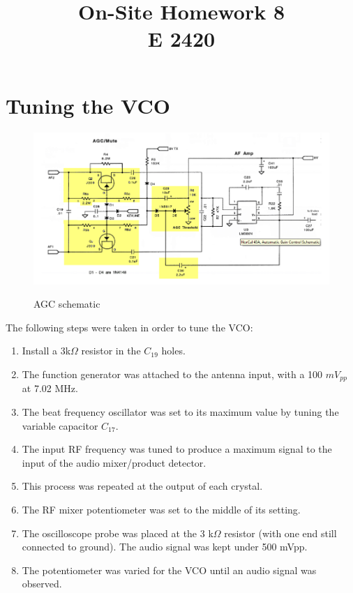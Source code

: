 \documentclass{article}
\title{On-Site Homework 8\\
  E 2420}
\author{\boxed{\text{Patrick Harrington}}}
\begin{document}
  \maketitle

  \section{Tuning the VCO}

  \begin{figure}[h!]
    \centering
    \includegraphics[scale=0.6]{AGC.png}
    \label{AGC}
    \caption{AGC schematic}
  \end{figure}
  The following steps were taken in order to tune the
  VCO:

  \begin{enumerate}
    \item   Install a 3k$\Omega$ resistor in the
      $C_{19}$ holes.
    \item   The function generator was
      attached to the antenna input, with a
      100 $mV_{pp}$ at 7.02 MHz.
    \item   The beat frequency
      oscillator was set to its
      maximum value by tuning the
      variable capacitor $C_{17}$.
    \item   The input RF
      frequency was tuned to
      produce a maximum signal
      to the input of the audio
      mixer/product detector. 
    \item   This process
      was repeated at the
      output of each
      crystal.
    \item   The RF
      mixer
      potentiometer
      was set to
      the middle of
      its setting.
    \item
      The
      oscilloscope
      probe
      was
      placed
      at the
      3
      k$\Omega$
      resistor
      (with
      one end
      still
      connected
      to
      ground).
      The
      audio
      signal
      was
      kept
      under
      500
      mVpp.
    \item
      The
      potentiometer
      was
      varied
      for
      the
      VCO
      until
      an
      audio
      signal
      was
      observed.
  \end{enumerate}
\end{document}
